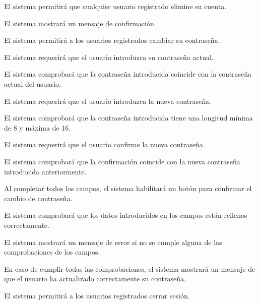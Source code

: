 \begin{enumitem}[label=\bfseries{RPer \arabic*.},leftmargin=*]
	\item El sistema permitirá que cualquier usuario registrado elimine su cuenta.
	\begin{enumitem}[label*=\bfseries{\arabic*.}]
		\item El sistema mostrará un mensaje de confirmación.
	\end{enumitem}
	\item El sistema permitirá a los usuarios registrados cambiar su contraseña.
	\begin{enumitem}[label*=\bfseries{\arabic*.}]
		\item El sistema requerirá que el usuario introduzca su contraseña actual.
		\begin{enumitem}[label*=\bfseries{\arabic*.}]
			\item El sistema comprobará que la contraseña introducida coincide con la contraseña actual del usuario.
		\end{enumitem}
		\item El sistema requerirá que el usuario introduzca la nueva contraseña.
		\begin{enumitem}[label*=\bfseries{\arabic*.}]
			\item El sistema comprobará que la contraseña introducida tiene una longitud mínima de 8 y máxima de 16.
		\end{enumitem}
		\item El sistema requerirá que el usuario confirme la nueva contraseña.
		\begin{enumitem}[label*=\bfseries{\arabic*.}]
			\item El sistema comprobará que la confirmación coincide con la nueva contraseña introducida anteriormente.
		\end{enumitem}
		\item Al completar todos los campos, el sistema habilitará un botón para confirmar el cambio de contraseña.
		\begin{enumitem}[label*=\bfseries{\arabic*.}]
			\item El sistema comprobará que los datos introducidos en los campos están rellenos correctamente.
			\begin{enumitem}[label*=\bfseries{\arabic*.}]
				\item El sistema mostrará un mensaje de error si no se cumple alguna de las comprobaciones de los campos.
				\item En caso de cumplir todas las comprobaciones, el sistema mostrará un mensaje de que el usuario ha actualizado correctamente su contraseña.
			\end{enumitem}
		\end{enumitem}
	\end{enumitem}
	\item El sistema permitirá a los usuarios registrados cerrar sesión.
\end{enumitem}

